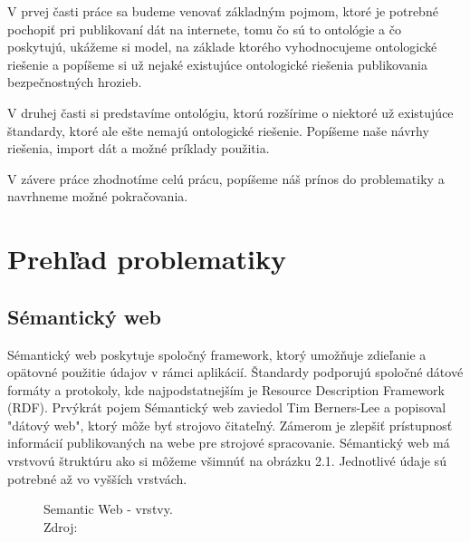 \documentclass[12pt, a4paper, oneside]{book}
\begin{document}

V prvej časti práce sa budeme venovať základným pojmom, ktoré je potrebné pochopiť pri publikovaní dát na internete, tomu čo sú to ontológie a čo poskytujú, ukážeme si model, na základe ktorého vyhodnocujeme ontologické riešenie a popíšeme si už nejaké existujúce ontologické riešenia publikovania bezpečnostných hrozieb.


V druhej časti si predstavíme ontológiu, ktorú rozšírime o niektoré už existujúce štandardy, ktoré ale ešte nemajú ontologické riešenie. Popíšeme naše návrhy riešenia, import dát a možné príklady použitia.


V závere práce zhodnotíme celú prácu, popíšeme náš prínos do problematiky a navrhneme možné pokračovania.




\part{Prehľad problematiky}
\chapter{Sémantický web}
Sémantický web \cite{semantic} poskytuje spoločný framework, ktorý umožňuje zdieľanie a opätovné použitie údajov v rámci aplikácií. Štandardy podporujú spoločné dátové formáty a protokoly, kde najpodstatnejším je Resource Description Framework (RDF). Prvýkrát pojem Sémantický web zaviedol Tim Berners-Lee a popisoval "dátový web", ktorý môže byť strojovo čitateľný. Zámerom je zlepšiť prístupnosť informácií publikovaných na webe pre strojové spracovanie. Sémantický web má vrstvovú štruktúru ako si môžeme všimnúť na obrázku 2.1. Jednotlivé údaje sú potrebné až vo vyšších vrstvách. 

\begin{figure}
\label{fig:semantic_web}
\caption{Semantic Web - vrstvy.\\Zdroj: \cite{semanticweb}}

\end{figure}
\end{document}
